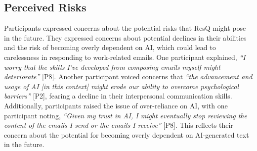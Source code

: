 \subsection{Perceived Risks}
\label{sec:result2_risks}
Participants expressed concerns about the potential risks that ResQ might pose in the future. 
They expressed concerns about potential declines in their abilities and the risk of becoming overly dependent on AI, which could lead to carelessness in responding to work-related emails.
One participant explained, \textit{``I worry that the skills I've developed from composing emails myself might deteriorate''} [P8]. 
Another participant voiced concerns that \textit{``the advancement and usage of AI [in this context] might erode our ability to overcome psychological barriers''} [P2], fearing a decline in their interpersonal communication skills.
Additionally, participants raised the issue of over-reliance on AI, with one participant noting, \textit{``Given my trust in AI, I might eventually stop reviewing the content of the emails I send or the emails I receive''} [P8]. 
This reflects their concern about the potential for becoming overly dependent on AI-generated text in the future.

